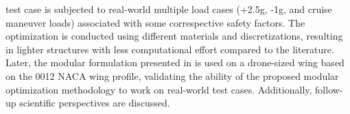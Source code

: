 test case is subjected to real-world multiple load cases (+2.5g, -1g, and cruise maneuver loads) associated with some correspective safety factors. The optimization is conducted using different materials and discretizations, resulting in lighter structures with less computational effort compared to the literature. Later, the modular formulation presented in  is used on a drone-sized wing based on the 0012 NACA wing profile, validating the ability of the proposed modular optimization methodology to work on real-world test cases. Additionally, follow-up scientific perspectives are discussed.